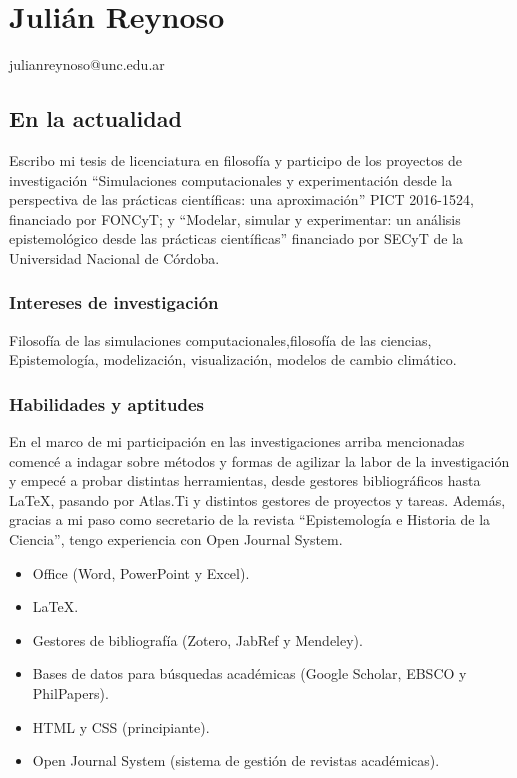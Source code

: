 \documentclass[]{article}
\date{}
\providecommand{\tightlist}{%
  \setlength{\itemsep}{0pt}\setlength{\parskip}{0pt}}
\begin{document}
\hypertarget{juliuxe1n-reynoso}{%
\section{Julián Reynoso}\label{juliuxe1n-reynoso}}

\leavevmode\hypertarget{webaddress}{}%
julianreynoso@unc.edu.ar

\hypertarget{en-la-actualidad}{%
\subsection{En la actualidad}\label{en-la-actualidad}}

Escribo mi tesis de licenciatura en filosofía y participo de los
proyectos de investigación ``Simulaciones computacionales y
experimentación desde la perspectiva de las prácticas científicas: una
aproximación'' PICT 2016-1524, financiado por FONCyT; y ``Modelar,
simular y experimentar: un análisis epistemológico desde las prácticas
científicas'' financiado por SECyT de la Universidad Nacional de
Córdoba.

\hypertarget{intereses-de-investigaciuxf3n}{%
\subsubsection{Intereses de
investigación}\label{intereses-de-investigaciuxf3n}}

Filosofía de las simulaciones computacionales,filosofía de las ciencias,
Epistemología, modelización, visualización, modelos de cambio climático.

\hypertarget{habilidades-y-aptitudes}{%
\subsubsection{Habilidades y aptitudes}\label{habilidades-y-aptitudes}}

En el marco de mi participación en las investigaciones arriba
mencionadas comencé a indagar sobre métodos y formas de agilizar la labor de la investigación y empecé a probar distintas
herramientas, desde gestores bibliográficos hasta LaTeX, pasando por
Atlas.Ti y distintos gestores de proyectos y tareas. Además, gracias a
mi paso como secretario de la revista ``Epistemología e Historia de la
Ciencia'', tengo experiencia con Open Journal System.

\begin{itemize}
\tightlist
\item
  Office (Word, PowerPoint y Excel).
\item
  LaTeX.
\item
  Gestores de bibliografía (Zotero, JabRef y Mendeley).
\item
  Bases de datos para búsquedas académicas (Google Scholar, EBSCO y
  PhilPapers).
\item
  HTML y CSS (principiante).
\item
  Open Journal System (sistema de gestión de revistas académicas).
\end{itemize}
\end{document}
